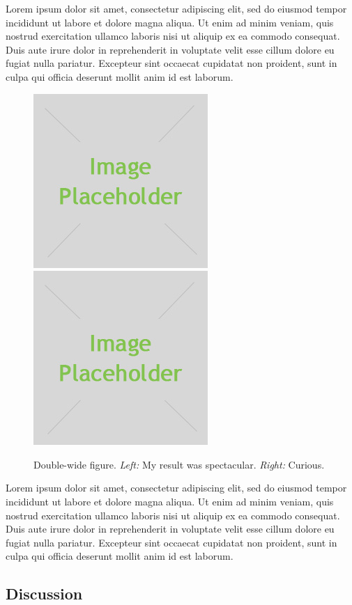 \documentclass[10pt,twocolumn,letterpaper]{article}
\begin{document}
Lorem ipsum dolor sit amet, consectetur adipiscing elit, sed do eiusmod tempor incididunt ut labore et dolore magna aliqua. Ut enim ad minim veniam, quis nostrud exercitation ullamco laboris nisi ut aliquip ex ea commodo consequat. Duis aute irure dolor in reprehenderit in voluptate velit esse cillum dolore eu fugiat nulla pariatur. Excepteur sint occaecat cupidatat non proident, sunt in culpa qui officia deserunt mollit anim id est laborum.

\begin{figure}[t]
    \centering
    \includegraphics[width=0.4\linewidth]{placeholder.jpg}
    \includegraphics[width=0.4\linewidth]{placeholder.jpg}
    \caption{Double-wide figure. \emph{Left:} My result was spectacular. \emph{Right:} Curious.}
    \label{fig:result2}
\end{figure}

Lorem ipsum dolor sit amet, consectetur adipiscing elit, sed do eiusmod tempor incididunt ut labore et dolore magna aliqua. Ut enim ad minim veniam, quis nostrud exercitation ullamco laboris nisi ut aliquip ex ea commodo consequat. Duis aute irure dolor in reprehenderit in voluptate velit esse cillum dolore eu fugiat nulla pariatur. Excepteur sint occaecat cupidatat non proident, sunt in culpa qui officia deserunt mollit anim id est laborum.

\subsection{Discussion}
\end{document}
